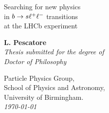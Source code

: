 \documentclass[a4paper,twoside,12pt]{report}
\newcommand{\thesistitle}{
Searching for new physics  \\
in $\bquark\to\squark\ell^+\ell^-$ transitions \\
 at the LHCb experiment
 }
\newcommand{\thesisauthor}{L. Pescatore} %
\newcommand{\thesiscrest}{crest_1}
\begin{document}
\begin{titlepage}
  \begin{center}
    \huge\sc\linespread{2} \thesistitle\\
    \end{center}
    \begin{center}
    \vspace{3.0cm}
    {\Large\bf \thesisauthor}\\
    \vspace{1.5cm}
    {\large\em Thesis submitted for the degree of}\\
    {\large\em Doctor of Philosophy}\\
    \vspace{1.5cm}
  \end{center}
  \begin{center}
  \end{center}
  \begin{flushleft}
    \hspace{7.5cm} Particle Physics Group, \\
    \hspace{7.5cm} School of Physics and Astronomy, \\
    \hspace{7.5cm} University of Birmingham. \\
    \vspace{1cm}
    \hspace{7.5cm} \emph{\today} \\
  \end{flushleft}
  \begin{center}
  \end{center}
\end{titlepage}

\thispagestyle{empty}%
~
\newpage


\pagestyle{fancy} %
\fancyfoot{} %
\fancyhead{}
\fancyhead[RE]{\sf \slshape \rightmark \hspace{5mm} \thepage }
\fancyhead[LO]{\sf \thepage \hspace{5mm} \slshape \leftmark }

\setcounter{tocdepth}{3}
\setcounter{secnumdepth}{3}
\renewcommand\tocloftpagestyle{fancy}
\renewcommand\cftchapfont{\large\sf}
\renewcommand\cftsecfont{\normalsize \sf}
\renewcommand\cftsubsecfont{\small\sf}
\renewcommand\cftsubsubsecfont{\footnotesize \sf}
%
\renewcommand\cftchappagefont{\bfseries\sffamily}
\renewcommand\cftsecpagefont{\bfseries\sffamily}
\renewcommand\cftsubsecpagefont{\bfseries\sffamily}
\renewcommand\cftsubsubsecpagefont{\bfseries\sffamily}
%
\renewcommand\cftloftitlefont{\Huge\sf}
\renewcommand\cftlottitlefont{\Huge\sf}
\renewcommand\cfttoctitlefont{\Huge\sf}
\end{document}
